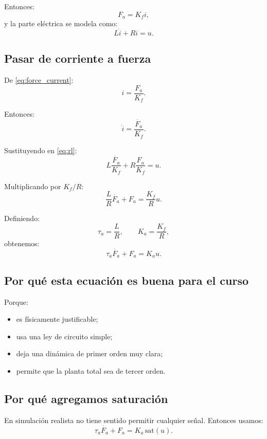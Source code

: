 \documentclass[11pt]{article}
\begin{document}
Entonces:
\begin{equation}
F_a = K_f i,
\label{eq:force_current}
\end{equation}
y la parte el\'ectrica se modela como:
\begin{equation}
L\dot{i} + Ri = u.
\label{eq:rl}
\end{equation}

\subsection{Pasar de corriente a fuerza}

De \eqref{eq:force_current}:
\[
i = \frac{F_a}{K_f}.
\]

Entonces:
\[
\dot{i} = \frac{\dot{F_a}}{K_f}.
\]

Sustituyendo en \eqref{eq:rl}:
\[
L\frac{\dot{F_a}}{K_f} + R\frac{F_a}{K_f} = u.
\]

Multiplicando por $K_f/R$:
\[
\frac{L}{R}\dot{F_a} + F_a = \frac{K_f}{R}u.
\]

Definiendo:
\[
\tau_a = \frac{L}{R},
\qquad
K_a = \frac{K_f}{R},
\]
obtenemos:
\begin{equation}
\tau_a\dot{F_a} + F_a = K_a u.
\label{eq:act_first_order}
\end{equation}

\subsection{Por qu\'e esta ecuaci\'on es buena para el curso}

Porque:

\begin{itemize}[leftmargin=1.2cm]
\item es f\'isicamente justificable;
\item usa una ley de circuito simple;
\item deja una din\'amica de primer orden muy clara;
\item permite que la planta total sea de tercer orden.
\end{itemize}

\subsection{Por qu\'e agregamos saturaci\'on}

En simulaci\'on realista no tiene sentido permitir cualquier se\~nal. Entonces usamos:
\begin{equation}
\tau_a\dot{F_a} + F_a = K_a\,\mathrm{sat}(u).
\label{eq:act_sat}
\end{equation}
\end{document}
